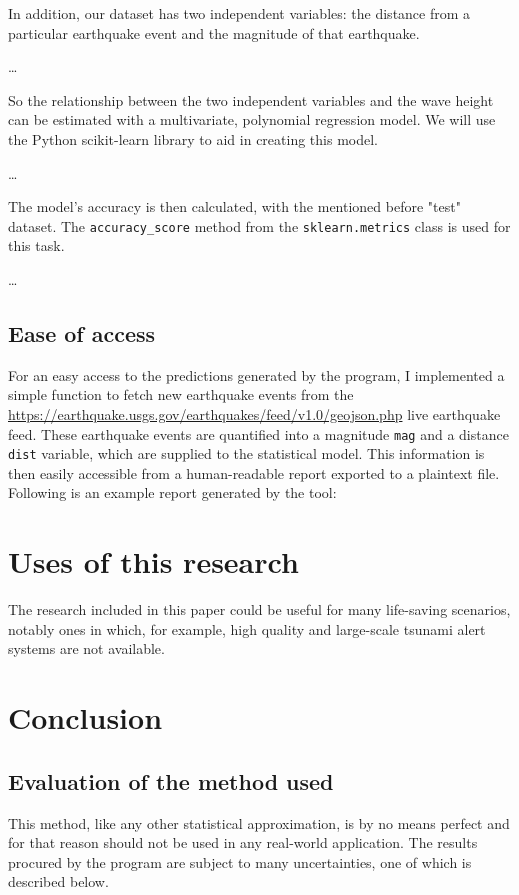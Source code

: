 \documentclass[11pt,letterpaper]{article}
\begin{document}
In addition, our dataset has two independent variables: the distance from a particular
earthquake event and the magnitude of that earthquake.


\dots

So the relationship between the two independent variables and the wave height can
be estimated with a multivariate, polynomial regression model. We will use the Python
scikit-learn library to aid in creating this model.


\dots

The model's accuracy is then calculated, with the mentioned before "test" dataset.
The \verb|accuracy_score| method from the \verb|sklearn.metrics| class is used for this
task.

\dots


\subsection{Ease of access}
For an easy access to the predictions generated by the program, I implemented
a simple function to fetch new earthquake events from the \url{https://earthquake.usgs.gov/earthquakes/feed/v1.0/geojson.php}
live earthquake feed. These earthquake events are quantified into a magnitude \verb|mag|
and a distance \verb|dist| variable, which are supplied to the statistical model.
This information is then easily accessible from a human-readable report exported
to a plaintext file. Following is an example report generated by the tool:

\section{Uses of this research}

The research included in this paper could be useful for many life-saving scenarios,
notably ones in which, for example, high quality and large-scale tsunami alert
systems are not available.

\section{Conclusion}

\subsection{Evaluation of the method used}

This method, like any other statistical approximation, is by no means perfect
and for that reason should not be used in any real-world application. The results
procured by the program are subject to many uncertainties, one of which is described
below.
\end{document}
